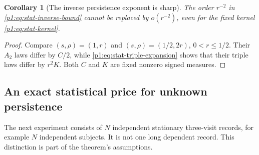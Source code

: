 \documentclass[11pt,a4paper]{article}
\newtheorem{corollary}[theorem]{Corollary}
\theoremstyle{definition}
\theoremstyle{remark}
\numberwithin{equation}{section}
\begin{document}
\begin{corollary}[The inverse persistence exponent is sharp]
\label{p1:cor:stat-sharp-amplification}
The order $r^{-2}$ in \eqref{p1:eq:stat-inverse-bound} cannot be replaced by
$o(r^{-2})$, even for the fixed kernel \eqref{p1:eq:stat-kernel}.
\end{corollary}
\begin{proof}
Compare $(s,\rho)=(1,r)$ and $(s,\rho)=(1/2,2r)$, $0<r\le1/2$.
Their $A_2$ laws differ by $C/2$, while \eqref{p1:eq:stat-triple-expansion}
shows that their triple laws differ by $r^2K$.  Both $C$ and $K$ are fixed
nonzero signed measures.
\end{proof}

\subsection{An exact statistical price for unknown persistence}

The next experiment consists of $N$ independent stationary three-visit
records, for example $N$ independent subjects.  It is not one long dependent
record.  This distinction is part of the theorem's assumptions.
\end{document}
